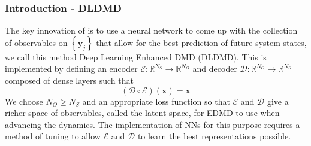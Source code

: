 \documentclass[11pt,aspectratio=169]{beamer}
\newcommand{\norm}[1]{\left|\left|#1\right|\right|}
\newcommand{\parens}[1]{\left(#1\right)}
\newcommand{\bracks}[1]{\left\{#1\right\}}
\newcommand{\R}{\mathbb{R}}
\begin{document}
    \begin{frame}
        \frametitle{Introduction - DLDMD}
        The key innovation of 
        \cite{lago} is to use a neural network to come up with the collection of 
        observables on $\bracks{\boldsymbol{y}_j}$ that allow for the best prediction 
        of future system states, we call this method Deep Learning Enhanced DMD (DLDMD). 
        This is implemented by defining an encoder 
        $\mathcal{E}: \R^{N_S} \to \R^{N_O}$ and decoder $\mathcal{D}: \R^{N_O} \to \R^{N_S}$ composed of 
        dense layers such that 
        \begin{equation}
            (\mathcal{D}\circ\mathcal{E})(\boldsymbol{x}) = \boldsymbol{x}
        \end{equation}
        We choose $N_O \geq N_S$ and an appropriate loss function so that 
        $\mathcal{E}$ and $\mathcal{D}$ give a richer space of observables, called the 
        latent space, for EDMD to use when advancing the dynamics. The implementation 
        of NNs for this purpose requires a method of tuning to allow $\mathcal{E}$ and 
        $\mathcal{D}$ to learn the best representations possible. 
    \end{frame}
    
\end{document}
